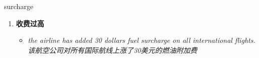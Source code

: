 
\begin{frame}
{\huge surcharge}
\begin{center}
\begin{enumerate}\Large
  \item \textbf{收费过高}
  \begin{itemize}
    \item \em{\Large{the airline has added 30 dollars fuel surcharge on all international flights. 该航空公司对所有国际航线上涨了30美元的燃油附加费}}
  \end{itemize}
\end{enumerate}
\end{center}
\end{frame}
